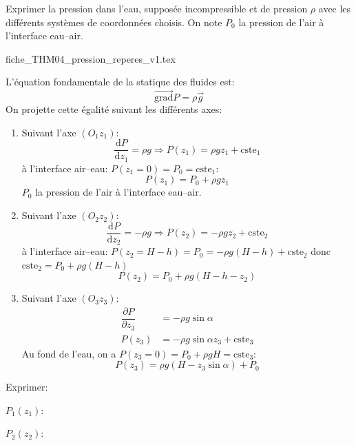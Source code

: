 Exprimer la pression dans l'eau, supposée incompressible et de pression
$\rho$ avec les différents systèmes de coordonnées choisis. On note
$P_{0}$ la pression de l'air à l'interface eau--air.

\begin{center}
{fiche_THM04_pression_reperes_v1.tex}
\end{center}

\begin{corrige}
L'équation fondamentale de la statique des fluides est: 
\[
\overrightarrow{\text{grad}}P=\rho\vec{g}
\]
On projette cette égalité suivant les différents axes:
\begin{enumerate}
\item Suivant l'axe $\left(O_{1}z_{1}\right)$:
\[
\dfrac{\mathrm{d}P}{\mathrm{d}z_{1}}=\rho g\Rightarrow P(z_{1})=\rho gz_{1}+\text{cste}_{1}
\]
à l'interface air--eau: $P(z_{1}=0)=P_{0}=\text{cste}_{1}$:
\[
P\left(z_{1}\right)=P_{0}+\rho gz_{1}
\]
$P_{0}$ la pression de l'air à l'interface eau--air.
\item Suivant l'axe $\left(O_{2}z_{2}\right)$:
\[
\dfrac{\mathrm{d}P}{\mathrm{d}z_{2}}=-\rho g\Rightarrow P(z_{2})=-\rho gz_{2}+\text{cste}_{2}
\]
à l'interface air--eau: $P(z_{2}=H-h)=P_{0}=-\rho g\left(H-h\right)+\text{cste}_{2}$
donc $\text{cste}_{2}=P_{0}+\rho g\left(H-h\right)$
\[
P\left(z_{2}\right)=P_{0}+\rho g\left(H-h-z_{2}\right)
\]
\item Suivant l'axe $\left(O_{3}z_{3}\right)$:
\begin{align*}
\dfrac{\partial P}{\partial z_{3}} & =-\rho g\sin\alpha\\
P(z_{3}) & =-\rho g\sin\alpha z_{3}+\text{cste}_{3}
\end{align*}
Au fond de l'eau, on a $P(z_{3}=0)=P_{0}+\rho gH=\text{cste}_{3}$:
\[
P(z_{3})=\rho g\left(H-z_{3}\sin\alpha\right)+P_{0}
\]
\end{enumerate}
\end{corrige}

Exprimer:

\debutEntrainement

\begin{enonce}
$P_{1}(z_{1})$:
\end{enonce}
%
\begin{enonce}
$P_{2}(z_{2})$:
\end{enonce}
%

